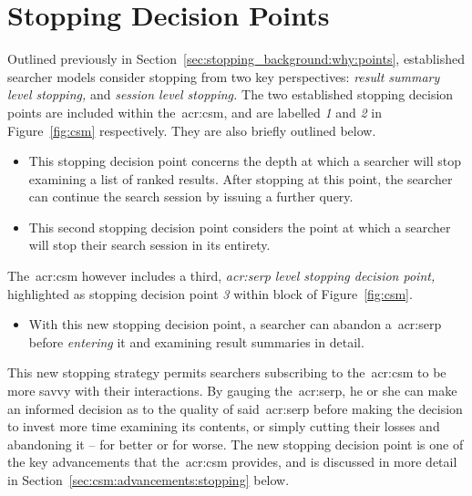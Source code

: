\section{Stopping Decision Points}\label{sec:csm:stopping}
Outlined previously in Section~\ref{sec:stopping_background:why:points}, established searcher models consider stopping from two key perspectives: \emph{result summary level stopping,} and \emph{session level stopping.} The two established stopping decision points are included within the~\gls{acr:csm}, and are labelled \emph{1} and \emph{2} in Figure~\ref{fig:csm} respectively. They are also briefly outlined below.

\begin{itemize}
    \item[\blueboxbold{1}]{ This stopping decision point concerns the depth at which a searcher will stop examining a list of ranked results. After stopping at this point, the searcher can continue the search session by issuing a further query.}
    \item[\blueboxbold{2}]{ This second stopping decision point considers the point at which a searcher will stop their search session in its entirety.}
\end{itemize}

The~\gls{acr:csm} however includes a third, \emph{\gls{acr:serp} level stopping decision point,} highlighted as stopping decision point \emph{3} within block  of Figure~\ref{fig:csm}.

\begin{itemize}
    \item[\blueboxbold{3}]{ With this new stopping decision point, a searcher can abandon a~\gls{acr:serp} before \emph{entering} it and examining result summaries in detail.}
\end{itemize}

This new stopping strategy permits searchers subscribing to the~\gls{acr:csm} to be more savvy with their interactions. By gauging the~\gls{acr:serp}, he or she can make an informed decision as to the quality of said~\gls{acr:serp} before making the decision to invest more time examining its contents, or simply cutting their losses and abandoning it -- for better or for worse. The new stopping decision point is one of the key advancements that the~\gls{acr:csm} provides, and is discussed in more detail in Section~\ref{sec:csm:advancements:stopping} below.

